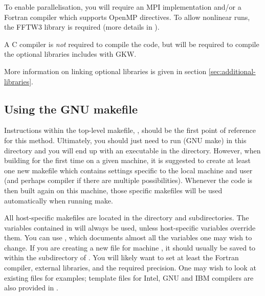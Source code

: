 To enable parallelisation, you will require an MPI implementation and/or a
Fortran compiler which supports OpenMP directives.  To allow nonlinear runs, 
the FFTW3 library is required (more details in ).

A C compiler is {\it not} required to compile the code, but will be required
to compile the optional libraries includes with GKW.

More information on linking optional libraries is given in 
section \ref{sec:additional-libraries}.

\subsection{Using the GNU makefile}

Instructions within the top-level makefile, , should be the
first point of reference for this method. Ultimately, you should just need to
run  (GNU make) in this directory and you will end up with an
executable in the  directory. However, when building for the first
time on a given machine, it is suggested to create at least one new makefile
which contains settings specific to the local machine and user (and perhaps
compiler if there are multiple possibilities). Whenever the code is then built
again on this machine, those specific makefiles will be used
automatically when running make.

All host-specific makefiles are located in the  directory and
subdirectories. The variables contained in  will
always be used, unless host-specific variables override them. You can use
, which documents almost all the variables one may wish
to change. If you are creating a new file for machine , it
should usually be saved to  within the 
subdirectory of . You will likely want to set at least the
Fortran compiler, external libraries, and the required precision. One may
wish to look at existing files for examples; template files for Intel, GNU
and IBM compilers are also provided in .

